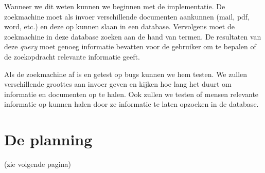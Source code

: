 \documentclass{uva-inf-article}
\begin{document}
Wanneer we dit weten kunnen we beginnen met de implementatie. De zoekmachine moet als invoer verschillende documenten aankunnen (mail, pdf, word, etc.) en deze op kunnen slaan in een database. Vervolgens moet de zoekmachine in deze database zoeken aan de hand van termen. De resultaten van deze \textit{query} moet genoeg informatie bevatten voor de gebruiker om te bepalen of de zoekopdracht relevante informatie geeft. 

Als de zoekmachine af is en getest op bugs kunnen we hem testen. We zullen verschillende groottes aan invoer geven en kijken hoe lang het duurt om informatie en documenten op te halen. Ook zullen we testen of mensen relevante informatie op kunnen halen door ze informatie te laten opzoeken in de database. 

\section{De planning} 
(zie volgende pagina)





\printbibliography

\end{document}
